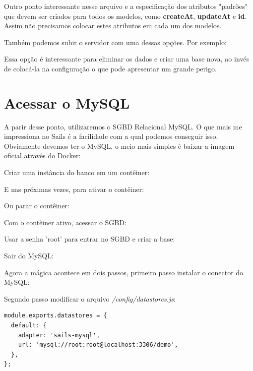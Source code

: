 \documentclass[a4paper,11pt]{article}
\begin{document}
Outro ponto interessante nesse arquivo e a especificação dos atributos "padrões" que devem ser criados para todos os modelos, como \textbf{createAt}, \textbf{updateAt} e \textbf{id}. Assim não precisamos colocar estes atributos em cada um dos modelos. 

Também podemos subir o servidor com uma dessas opções. Por exemplo: \\

Essa opção é interessante para eliminar os dados e criar uma base nova, ao invés de colocá-la na configuração o que pode apresentar um grande perigo.
 
\section{Acessar o MySQL}
A parir desse ponto, utilizaremos o SGBD Relacional MySQL. O que mais me impressiona no Sails é a facilidade com a qual podemos conseguir isso. Obviamente devemos ter o MySQL, o meio mais simples é baixar a imagem oficial através do Docker: \\

Criar uma instância do banco em um contêiner: \\

E nas próximas vezes, para ativar o contêiner: \\

Ou parar o contêiner: \\

Com o contêiner ativo, acessar o SGBD: \\

Usar a senha 'root' para entrar no SGBD e criar a base: \\

Sair do MySQL: \\

Agora a mágica acontece em dois passos, primeiro passo instalar o conector do MySQL: \\

Segundo passo modificar o arquivo \textit{/config/datastores.js}:
\begin{lstlisting}
module.exports.datastores = {
  default: {
    adapter: 'sails-mysql',
    url: 'mysql://root:root@localhost:3306/demo',
  },
};
\end{lstlisting}
\end{document}
